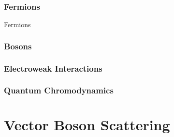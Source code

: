 \documentclass[12pt]{niuthesis}
\begin{document}



    \subsection{Fermions}
        Fermions
    \subsection{Bosons}
    \subsection{Electroweak Interactions}
    \subsection{Quantum Chromodynamics}

\chapter{Vector Boson Scattering}
\end{document}
